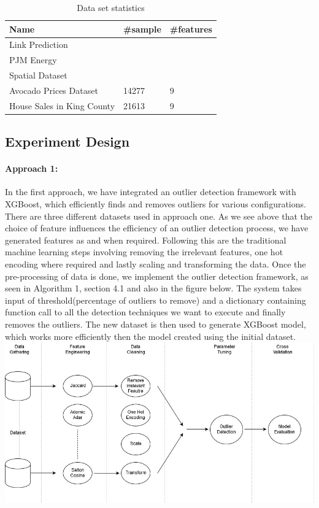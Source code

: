 \documentclass[runningheads]{llncs}
\begin{document}
\begin{table}[h]
\begin{center}
\begin{tabular}{|l|l|l|}
\hline
Name                       & \#sample & \#features \\ \hline
Link Prediction            &          &            \\ \hline
PJM Energy                 &          &            \\ \hline
Spatial Dataset            &          &            \\ \hline
Avocado Prices Dataset     & 14277    & 9          \\ \hline
House Sales in King County & 21613    & 9          \\ \hline
\end{tabular}
\end{center}
\caption{Data set statistics}
\end{table}

\subsection{Experiment Design}

\paragraph*{Approach 1:} In the first approach, we have integrated an outlier detection framework with XGBoost, which efficiently finds and removes outliers for various configurations. There are three different datasets used in approach one. As we see above that the choice of feature influences the efficiency of an outlier detection process, we have generated features as and when required. Following this are the traditional machine learning steps involving removing the irrelevant features, one hot encoding where required and lastly scaling and transforming the data. Once the pre-processing of data is done, we implement the outlier detection framework, as seen in Algorithm 1, section 4.1 and also in the figure below. The system takes input of threshold(percentage of outliers to remove) and a dictionary containing function call to all the detection techniques we want to execute and finally removes the outliers. The new dataset is then used to generate XGBoost model, which works more efficiently then the model created using the initial dataset. \\

\includegraphics[scale=0.4]{hld-network.jpg}\\
\end{document}
